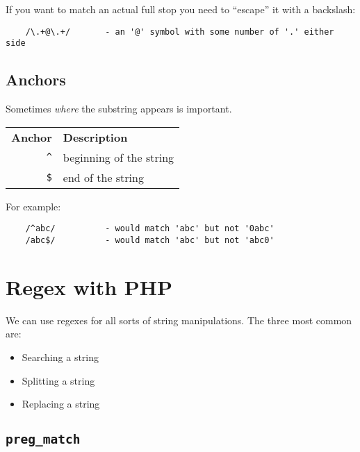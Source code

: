 If you want to match an actual full stop you need to ``escape'' it with a backslash:

\begin{verbatim}
    /\.+@\.+/       - an '@' symbol with some number of '.' either side
\end{verbatim}



\subsection{Anchors}

Sometimes \textit{where} the substring appears is important.

\begin{center}
    \begin{small}
        \begin{tabularx}{\textwidth}{r l}
            \textbf{Anchor}             & \textbf{Description} \\
            \texttt{\textasciicircum}   & beginning of the string \\
            \texttt{\$}                 & end of the string \\
        \end{tabularx}
    \end{small}
\end{center}

For example:

\begin{verbatim}
    /^abc/          - would match 'abc' but not '0abc'
    /abc$/          - would match 'abc' but not 'abc0'
\end{verbatim}


\section{Regex with PHP}

We can use regexes for all sorts of string manipulations. The three most common are:

\begin{itemize}
    \item Searching a string
    \item Splitting a string
    \item Replacing a string
\end{itemize}


\subsection{\texttt{preg\_match}}

